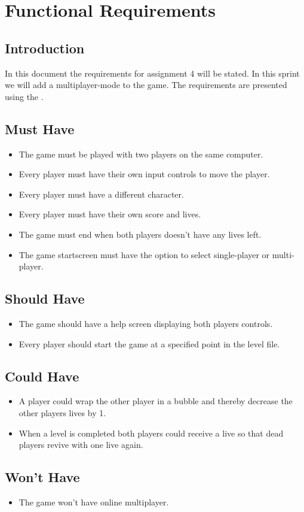 \chapter{Functional Requirements}

\section{Introduction}
In this document the requirements for assignment 4 will be stated. In this sprint we will add a multiplayer-mode to the game. \noindent The requirements are presented using the .

\section{Must Have}
\begin{itemize}
\itemsep0em
\item The game must be played with two players on the same computer. 
\item Every player must have their own input controls to move the player.
\item Every player must have a different character.
\item Every player must have their own score and lives.
\item The game must end when both players doesn't have any lives left.
\item The game startscreen must have the option to select single-player or multi-player. 
\end{itemize}

\section{Should Have}
\begin{itemize}
\itemsep0em
\item The game should have a help screen displaying both players controls. 
\item Every player should start the game at a specified point in the level file. 
\end{itemize}

\section{Could Have}
\begin{itemize}
\itemsep0em
\item A player could wrap the other player in a bubble and thereby decrease the other players lives by 1. 
\item When a level is completed both players could receive a live so that dead players revive with one live again. 
\end{itemize}

\section{Won't Have}
\begin{itemize}
\itemsep0em
\item The game won't have online multiplayer. 
\end{itemize}